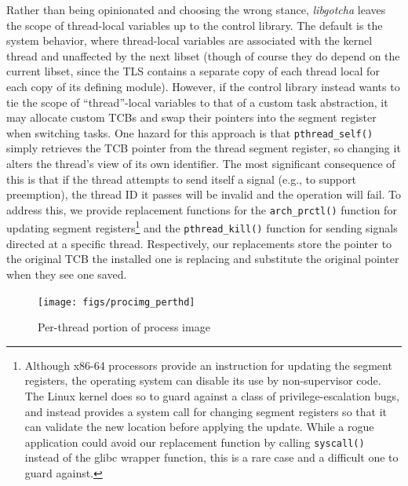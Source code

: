 Rather than being opinionated and choosing the wrong stance, \textit{libgotcha}
leaves the scope of thread-local variables up to the control library.  The
default is the system behavior, where thread-local variables are associated with the
kernel thread and unaffected by the next libset (though of course they
do depend on the current libset, since the TLS contains a separate copy of each
thread local for each copy of its defining module).  However, if the
control library instead wants to tie the scope of ``thread''-local variables to that
of a custom task abstraction, it may allocate custom TCBs and swap their pointers
into the segment register when switching tasks.  One
hazard for this approach is that \texttt{pthread\_self()} simply retrieves the TCB
pointer from the thread segment register, so changing it alters the thread's view of
its own identifier.  The most significant consequence of this is that if the thread
attempts to send itself a signal (e.g., to support preemption), the thread ID it
passes will be invalid and the operation will fail.  To address this, we provide
replacement functions for the \texttt{arch\_prctl()} function for updating segment
registers\footnote{Although x86-64 processors provide an instruction for updating the
segment registers, the operating system can disable its use by non-supervisor code.
The Linux kernel does so to guard against a class of privilege-escalation bugs, and
instead provides a system call for changing segment registers so that it can validate
the new location before applying the update.  While a rogue application could avoid
our replacement function by calling \texttt{syscall()} instead of the glibc wrapper
function, this is a rare case and a difficult one to guard against.} and the
\texttt{pthread\_kill()} function for sending signals directed at a specific thread.
Respectively, our replacements store the pointer to the original TCB the installed
one is replacing and substitute the original pointer when they see one saved.

\begin{figure}
\texttt{[image: figs/procimg\_perthd]}
\caption{Per-thread portion of process image}
\label{fig:procimgthd}
\end{figure}

